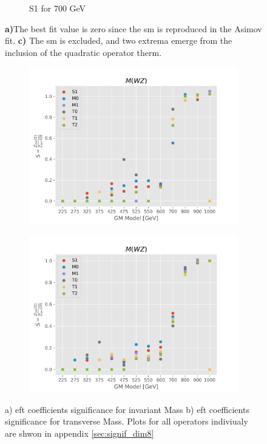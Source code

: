 \documentclass[../Bachelorarbeit.tex]{subfiles}
\begin{document}
\begin{figure}[h]
\begin{subfigure}{0.3\textwidth}
        \caption{S1 for 700 GeV}
    \end{subfigure}
    \caption{\textbf{a)}The best fit value is zero since the \acrshort{sm} is reproduced in the Asimov fit.
        \textbf{c)} The \acrshort{sm} is excluded, and two extrema emerge from the inclusion of the quadratic operator therm.}
    \label{fig:EFT_GM_Asimov_comparision}
\end{figure}

\begin{figure}[h]
    \centering
    \begin{subfigure}{0.45\textwidth}
        \includegraphics[width=\textwidth]{Plots/gm_relevanze/MWZ_all.png}
        \caption{}
    \end{subfigure}
    \begin{subfigure}{0.45\textwidth}
        \includegraphics[width=\textwidth]{Plots/gm_relevanze/MTWZ_all.png}
        \caption{}
    \end{subfigure}
    \caption{a) \acrshort{eft} coefficients significance for invariant Mass b) \acrshort{eft} coefficients significance for transverse Mass. Plots for all operators indiviualy are shwon in appendix \ref{sec:signif_dim8}}
    \label{fig:significans_plots}
\end{figure}
\end{document}
